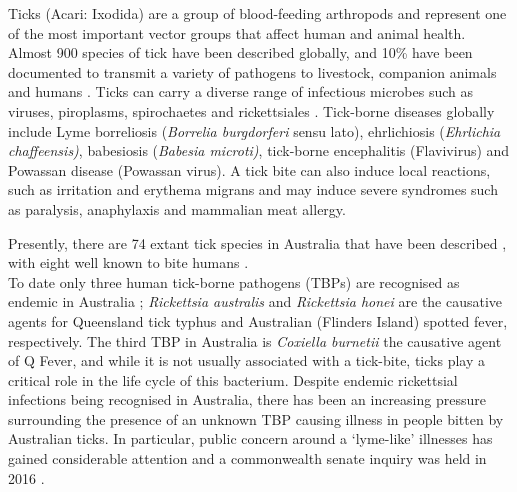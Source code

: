 \documentclass[a4paper, nobind]{templates/ociamthesis}
\begin{document}
Ticks (Acari: Ixodida) are a group of blood-feeding arthropods and represent one of the most important vector groups that affect human and animal health. Almost 900 species of tick have been described globally, and 10\% have been documented to transmit a variety of pathogens to livestock, companion animals and humans \autocite{jongejanGlobalImportanceTicks2004}.
Ticks can carry a diverse range of infectious microbes such as viruses, piroplasms, spirochaetes and rickettsiales \autocite{pfaffleEcologyTickborneDiseases2013}.
Tick-borne diseases globally include Lyme borreliosis (\emph{Borrelia burgdorferi} sensu lato), ehrlichiosis (\emph{Ehrlichia chaffeensis)}, babesiosis (\emph{Babesia microti)}, tick-borne encephalitis (Flavivirus) and Powassan disease (Powassan virus).
A tick bite can also induce local reactions, such as irritation and erythema migrans and may induce severe syndromes such as paralysis, anaphylaxis and mammalian meat allergy\autocite{vannunenTickinducedAllergiesMammalian2015,beamanNoninfectiousIllnessTick2018,pienaarTickParalysisSolving2018}.

Presently, there are 74 extant tick species in Australia that have been described \autocite{barkerList70Species2014,ashMorphologicalMolecularDescription2017,heathNewSpeciesTick2017,kwakIxodesHeathiSp2018,barkerIxodesBarkeriSp2019}, with eight well known to bite humans \autocite{barkerTicksAustraliaSpecies2014}.\\
To date only three human tick-borne pathogens (TBPs) are recognised as endemic in Australia \autocite{gravesTickborneInfectiousDiseases2017}; \emph{Rickettsia australis} and \emph{Rickettsia honei} are the causative agents for Queensland tick typhus and Australian (Flinders Island) spotted fever, respectively.
The third TBP in Australia is \emph{Coxiella burnetii} the causative agent of Q Fever, and while it is not usually associated with a tick-bite, ticks play a critical role in the life cycle of this bacterium.
Despite endemic rickettsial infections being recognised in Australia, there has been an increasing pressure surrounding the presence of an unknown TBP causing illness in people bitten by Australian ticks.
In particular, public concern around a `lyme-like' illnesses has gained considerable attention and a commonwealth senate inquiry was held in 2016 \autocite{radcliffeGrowingEvidenceEmerging2016}.
\end{document}
